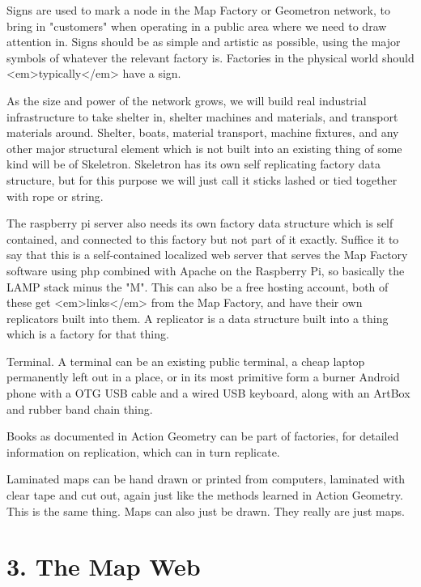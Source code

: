 \documentclass[11pt]{article}
\begin{document}
Signs are used to mark a node in the Map Factory or Geometron network, to bring in "customers" when operating in a public area where we need to draw attention in.  Signs should be as simple and artistic as possible, using the major symbols of whatever the relevant factory is.  Factories in the physical world should <em>typically</em> have a sign. 




As the size and power of the network grows, we will build real industrial infrastructure to take shelter in, shelter machines and materials, and transport materials around.  Shelter, boats, material transport, machine fixtures, and any other major structural element which is not built into an existing thing of some kind will be of Skeletron.  Skeletron has its own self replicating factory data structure, but for this purpose we will just call it sticks lashed or tied together with rope or string.




The raspberry pi server also needs its own factory data structure which is self contained, and connected to this factory but not part of it exactly.  Suffice it to say that this is a self-contained localized web server that serves the Map Factory software using php combined with Apache on the Raspberry Pi, so basically the LAMP stack minus the "M".  This can also be a free hosting account, both of these get <em>links</em> from the Map Factory, and have their own replicators built into them.  A replicator is a data structure built into a thing which is a factory for that thing.




Terminal.  A terminal can be an existing public terminal, a cheap laptop permanently left out in a place, or in its most primitive form a burner Android phone with a OTG USB cable and a wired USB keyboard, along with an ArtBox and rubber band chain thing.




Books as documented in Action Geometry can be part of factories, for detailed information on replication, which can in turn replicate.




Laminated maps can be hand drawn or printed from computers, laminated with clear tape and cut out, again just like the methods learned in Action Geometry.  This is the same thing.  Maps can also just be drawn.  They really are just maps.  



\section{3. The Map Web}
\end{document}
